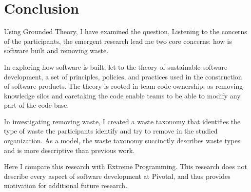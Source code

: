 
\chapter{Conclusion}

Using Grounded Theory, I have examined the question,  Listening to the concerns of the participants, the emergent research lead me two core concerns: how is software built and removing waste. 
 
In exploring how software is built, let to the theory of sustainable software development, a set of principles, policies, and practices used in the construction of software products. The theory is rooted in team code ownership, as removing knowledge silos and caretaking the code enable teams to be able to modify any part of the code base. 

In investigating removing waste, I created a waste taxonomy that identifies the type of waste the participants identify and try to remove in the studied organization. As a model, the waste taxonomy succinctly describes waste types and  is more descriptive than previous work. 

Here I compare this research with Extreme Programming. This research does not describe every aspect of software development at Pivotal, and thus provides motivation for additional future research. 